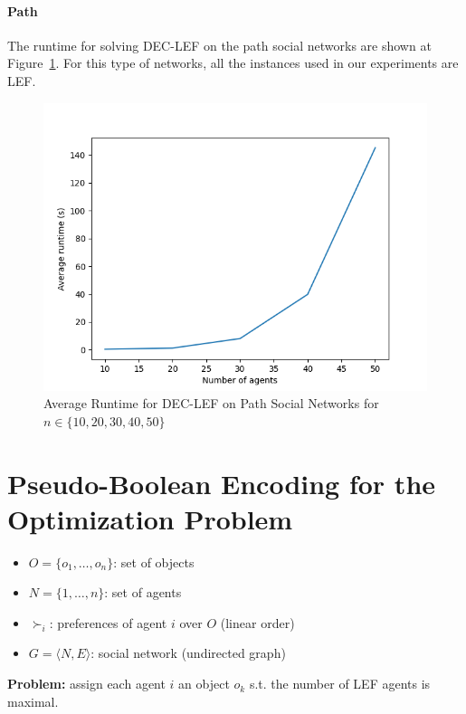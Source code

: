 \documentclass{article}
\begin{document}
\paragraph{Path} The runtime for solving DEC-LEF on the path social networks are shown at Figure~\ref{fig:runtime-path}. For this type of networks, all the instances used in our experiments are LEF.
\begin{figure}[htb]
\centering
\includegraphics[width=0.5\linewidth]{results-runtime-path.png}
\caption{Average Runtime for DEC-LEF on Path Social Networks for $n \in \{10,20,30,40,50\}$\label{fig:runtime-path}}
\end{figure}

\section{Pseudo-Boolean Encoding for the Optimization Problem}
\begin{itemize}
	\item $O = \{o_1, \dots, o_n\}$: set of objects
	\item $N = \{1,\dots,n\}$: set of agents
	\item $\succ_i$: preferences of agent $i$ over $O$ (linear order)
	\item $G = \langle N, E\rangle$: social network (undirected graph)
\end{itemize}
{\bf Problem:} assign each agent $i$ an object $o_k$ s.t. the number of LEF agents is maximal.
\end{document}
